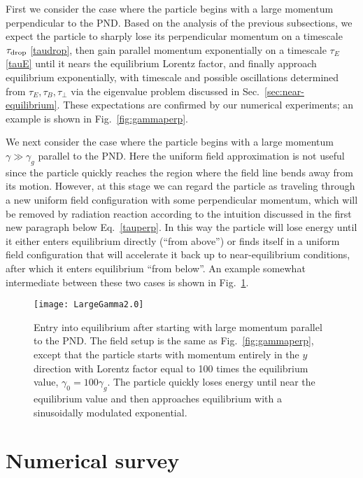 \documentclass[amsmath,amssymb,nofootinbib,notitlepage,superscriptaddress,twocolumn]{revtex4-2}
\begin{document}
First we consider the case where the particle begins with a large momentum perpendicular to the PND.  Based on the analysis of the previous subsections, we expect the particle to sharply lose its perpendicular momentum on a timescale $\tau_{\rm drop}$ \eqref{taudrop}, then gain parallel momentum exponentially on a timescale $\tau_E$ \eqref{tauE} until it nears the equilibrium Lorentz factor, and finally approach equilibrium exponentially, with timescale and possible oscillations determined from $\tau_E,\tau_B,\tau_\perp$ via the eigenvalue problem discussed in Sec.~\ref{sec:near-equilibrium}.  These expectations are confirmed by our numerical experiments; an example is shown in Fig.~\ref{fig:gammaperp}.

We next consider the case where the particle begins with a large momentum $\gamma \gg \gamma_g$ parallel to the PND.  Here the uniform field approximation is not  useful since the particle quickly reaches the region where the field line bends away from its motion.  However, at this stage we can regard the particle as traveling through a new uniform field configuration with some perpendicular momentum, which will be removed by radiation reaction according to the intuition discussed in the first new paragraph below Eq.~\eqref{tauperp}.  In this way the particle will lose energy until it either enters equilibrium directly (``from above'') or finds itself in a uniform field configuration that will accelerate it back up to near-equilibrium conditions, after which it enters equilibrium ``from below''.  An example somewhat intermediate between these two cases is shown in Fig.~\ref{fig:gammapar}.

\begin{figure}
    \centering
    \texttt{[image: LargeGamma2.0]}\\
    \caption{Entry into equilibrium after starting with large momentum parallel to the PND.  The field setup is the same as Fig.~\ref{fig:gammaperp}, except that the particle starts with momentum entirely in the $y$ direction with Lorentz factor equal to 100 times the equilibrium value, $\gamma_0=100\gamma_{g}$.  The particle quickly loses energy until near the equilibrium value and then approaches equilibrium with a sinusoidally modulated exponential.
    }
    \label{fig:gammapar}
\end{figure}


\section{Numerical survey}\label{sec:C4}
\end{document}
